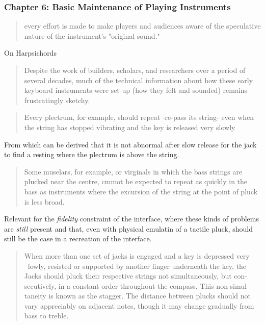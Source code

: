 \subsubsection{Chapter 6: Basic Maintenance of Playing Instruments}

\begin{quotation}
    every effort is made to make players and audiences aware of the speculative
    nature of the instrument's "original sound."
\end{quotation}


On Harpsichords

\begin{quotation}
    Despite the work of builders, scholars, and researchers over a period of
    several decades, much of the technical information about how these early
    keyboard instruments were set up (how they felt and sounded) remains
    frustratingly sketchy.
\end{quotation}

\begin{quotation}
    Every plectrum, for example, should repeat -re-pass its string- even when
    the string has stopped vibrating and the key is released very slowly
\end{quotation}

From which can be derived that it is not abnormal after slow release for the
jack to find a resting where the plectrum is above the string.

\begin{quotation}
     Some muselars, for example, or virginals in which the bass strings are
     plucked near the centre, cmmot be expected to repeat as quickly in the bass
     as instruments where the excursion of the string at the point of pluck is
     less broad.
\end{quotation}

Relevant for the \textit{fidelity} constraint of the interface, where these
kinds of problems are \textit{still} present and that, even with physical
emulatin of a tactile pluck, should still be the case in a recreation of the
interface.


\begin{quotation}
    When more than one set of jacks is engaged and a key is depressed very
~lowly, resisted or supported by another finger underneath the key, the Jacks
should pluck their respective strings not simultaneously, but con- secutively,
in a constant order throughout the compass. This non-simul- taneity is known as
the stagger. The distance between plucks should not vary appreciably on adjacent
notes, though it may change gradually from bass to treble.
\end{quotation}

